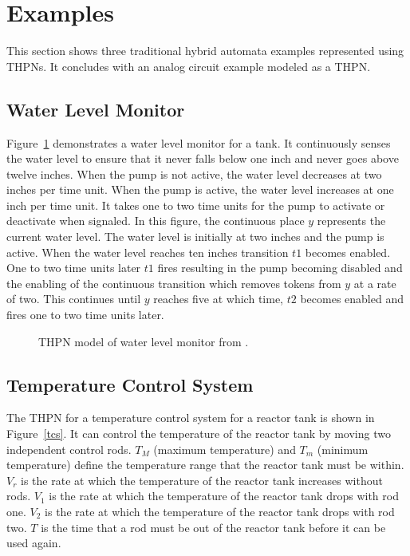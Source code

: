 \documentclass[11pt,times]{article}
\begin{document}
\section{Examples}

This section shows three traditional hybrid automata examples represented using
THPNs.  It concludes with an analog circuit example modeled as a THPN.

\subsection{Water Level Monitor}

Figure~\ref{wlm} demonstrates a water level monitor for a tank.  It
continuously senses the water level to ensure that it never falls
below one inch and never goes above twelve inches.  When the pump is not
active, the water level decreases at two inches per time unit.  When the
pump is active, the water level increases at one inch per time unit.
It takes one to two time units for the pump to activate or deactivate
when signaled.  In this figure, the continuous place $y$ represents
the current water level.  The water level is initially at two inches and
the pump is active.  When the water level reaches ten inches
transition $t1$ becomes enabled.  One to two time units later $t1$
fires resulting in the pump becoming disabled and the enabling of
the continuous transition which removes tokens from $y$ at a rate
of two.  This continues until $y$ reaches five at which time, $t2$
becomes enabled and fires one to two time units later.  

\begin{figure}[htbp]
\begin{center}
{\caption{\label{wlm}THPN model of water level monitor from
    \cite{alur95algorithmic}.}}
\end{center}
\end{figure}

\subsection{Temperature Control System}

The THPN for a temperature control system for a reactor tank is shown in 
Figure~\ref{tcs}. It can control the temperature of the reactor tank by moving
two independent control rods. $T_M$ (maximum
temperature) and $T_m$ (minimum temperature) define the temperature
range that the reactor tank must be within.  $V_r$ is the rate at which
the temperature of the reactor tank increases without rods.  $V_1$ is
the rate at which the temperature of the reactor tank drops with rod
one.  $V_2$ is the rate at which the temperature of the reactor
tank drops with rod two.  $T$ is the time that a rod must be out of the
reactor tank before it can be used again.
\end{document}
